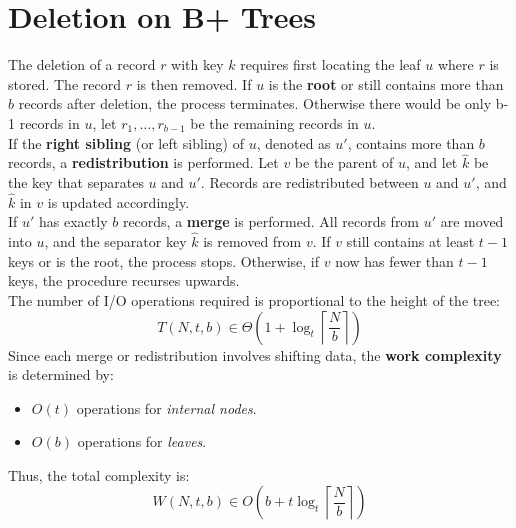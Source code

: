 \documentclass{report}
\begin{document}
\section{Deletion on B+ Trees}
The deletion of a record \( r \) with key \( k \) requires first locating the leaf \( u \) where \( r \) is stored. The record \( r \) is then removed. If \( u \) is the \textbf{root} or still contains more than \( b \) records after deletion, the process terminates. Otherwise there would be only b-1 records in \(u\), let \( r_1, \dots, r_{b-1} \) be the remaining records in \( u \).
\\If the \textbf{right sibling} (or left sibling) of \( u \), denoted as \( u' \), contains more than \( b \) records, a \textbf{redistribution} is performed. Let \( v \) be the parent of \( u \), and let \( \hat{k} \) be the key that separates \( u \) and \( u' \). Records are redistributed between \( u \) and \( u' \), and \( \hat{k} \) in \( v \) is updated accordingly.
\\If \( u' \) has exactly \( b \) records, a \textbf{merge} is performed. All records from \( u' \) are moved into \( u \), and the separator key \( \hat{k} \) is removed from \( v \). If \( v \) still contains at least \( t - 1 \) keys or is the root, the process stops. Otherwise, if \( v \) now has fewer than \( t - 1 \) keys, the procedure recurses upwards.
\\The number of I/O operations required is proportional to the height of the tree:
\begin{equation}
T(N,t,b) \in \Theta \left( 1 + \log_t \left\lceil \frac{N}{b} \right\rceil \right)
\end{equation}
\noindent
Since each merge or redistribution involves shifting data, the \textbf{work complexity} is determined by:
\begin{itemize}
    \item \( O(t) \) operations for \textit{internal nodes}.
    \item \( O(b) \) operations for \textit{leaves}.
\end{itemize}
\noindent
Thus, the total complexity is:
\begin{equation}
W(N,t,b) \in O \left( b + t \log_t \left\lceil \frac{N}{b} \right\rceil \right)
\end{equation}
\end{document}
